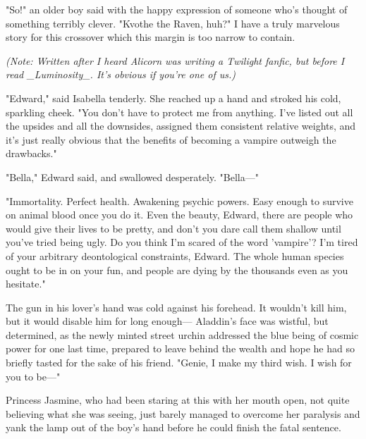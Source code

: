 "So!" an older boy said with the happy expression of someone who's thought of 
something terribly clever. "Kvothe the Raven, huh?"
\sbreak
I have a truly marvelous story for this crossover which this margin is too 
narrow to contain.
\sbreak


\emph{(Note: Written after I heard Alicorn was writing a Twilight fanfic, but 
before I read \_Luminosity\_. It's obvious if you're one of us.)}

\noindent{}"Edward," said Isabella tenderly. She reached up a hand and stroked his cold, 
sparkling cheek. "You don't have to protect me from anything. I've listed out 
all the upsides and all the downsides, assigned them consistent relative 
weights, and it's just really obvious that the benefits of becoming a vampire 
outweigh the drawbacks."

"Bella," Edward said, and swallowed desperately. "Bella---"

"Immortality. Perfect health. Awakening psychic powers. Easy enough to survive 
on animal blood once you do it. Even the beauty, Edward, there are people who 
would give their lives to be pretty, and don't you dare call them shallow until 
you've tried being ugly. Do you think I'm scared of the word 'vampire'? I'm 
tired of your arbitrary deontological constraints, Edward. The whole human 
species ought to be in on your fun, and people are dying by the thousands even 
as you hesitate."

The gun in his lover's hand was cold against his forehead. It wouldn't kill 
him, but it would disable him for long enough---
\sbreak
Aladdin's face was wistful, but determined, as the newly minted street urchin 
addressed the blue being of cosmic power for one last time, prepared to leave 
behind the wealth and hope he had so briefly tasted for the sake of his friend. 
"Genie, I make my third wish. I wish for you to be---"

Princess Jasmine, who had been staring at this with her mouth open, not quite 
believing what she was seeing, just barely managed to overcome her paralysis 
and yank the lamp out of the boy's hand before he could finish the fatal 
sentence.

